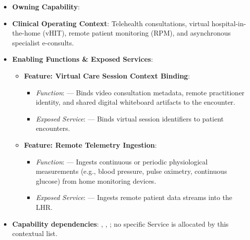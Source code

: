 \begin{itemize}

\item 
\textbf{Owning Capability}: \texttt{}



\item 
\textbf{Clinical Operating Context}: Telehealth consultations, virtual hospital-in-the-home (vHIT), remote patient monitoring (RPM), and asynchronous specialist e-consults.



\item 
\textbf{Enabling Functions \& Exposed Services}:


\begin{itemize}

\item 
\textbf{Feature: Virtual Care Session Context Binding}:


\begin{itemize}

\item 
\emph{Function}: \texttt{} — Binds video consultation metadata, remote practitioner identity, and shared digital whiteboard artifacts to the encounter.



\item 
\emph{Exposed Service}: \texttt{} — Binds virtual session identifiers to patient encounters.



\end{itemize}


\item 
\textbf{Feature: Remote Telemetry Ingestion}:


\begin{itemize}

\item 
\emph{Function}: \texttt{} — Ingests continuous or periodic physiological measurements (e.g., blood pressure, pulse oximetry, continuous glucose) from home monitoring devices.



\item 
\emph{Exposed Service}: \texttt{} — Ingests remote patient data streams into the LHR.



\end{itemize}


\end{itemize}


\item 
\textbf{Capability dependencies}: \texttt{}, \texttt{}, \texttt{}; no specific Service is allocated by this contextual list.



\end{itemize}
